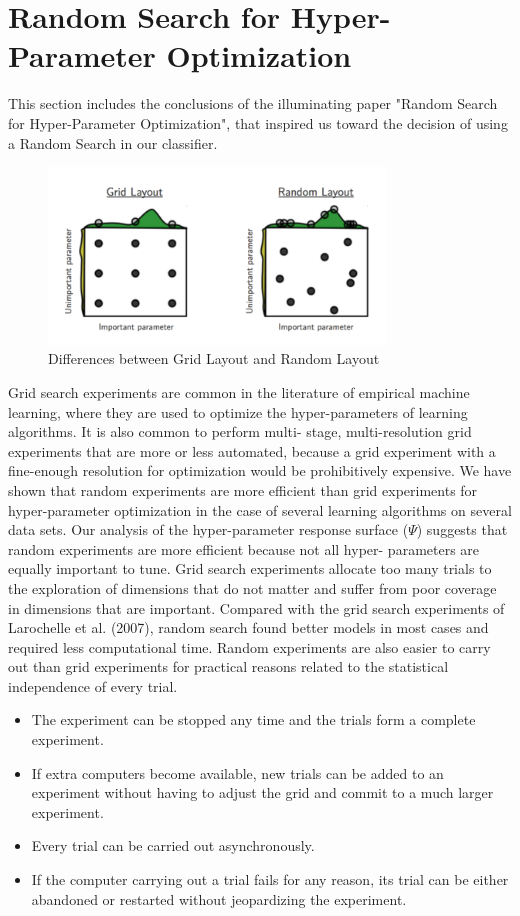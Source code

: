 \section{Random Search for Hyper-Parameter Optimization}
This section includes the conclusions of the illuminating paper "Random Search for Hyper-Parameter Optimization", that inspired us toward the decision of using a Random Search in our classifier.\cite{rnd_src}

\begin{figure}
\centering
\includegraphics[width=0.8\textwidth]{img/gridsrc.png}
\caption{Differences between Grid Layout and Random Layout}
\label{}
\end{figure}

Grid search experiments are common in the literature of empirical machine learning, where they are used to optimize the hyper-parameters of learning algorithms. It is also common to perform multi- stage, multi-resolution grid experiments that are more or less automated, because a grid experiment with a fine-enough resolution for optimization would be prohibitively expensive. We have shown that random experiments are more efficient than grid experiments for hyper-parameter optimization in the case of several learning algorithms on several data sets. Our analysis of the hyper-parameter response surface ($\Psi$) suggests that random experiments are more efficient because not all hyper- parameters are equally important to tune. Grid search experiments allocate too many trials to the exploration of dimensions that do not matter and suffer from poor coverage in dimensions that are important. Compared with the grid search experiments of Larochelle et al. (2007), random search found better models in most cases and required less computational time.
Random experiments are also easier to carry out than grid experiments for practical reasons related to the statistical independence of every trial.

\begin{itemize}
\item The experiment can be stopped any time and the trials form a complete experiment.
\item If extra computers become available, new trials can be added to an experiment without having to adjust the grid and commit to a much larger experiment.
\item Every trial can be carried out asynchronously.
\item If the computer carrying out a trial fails for any reason, its trial can be either abandoned or restarted without jeopardizing the experiment.
\end{itemize}

